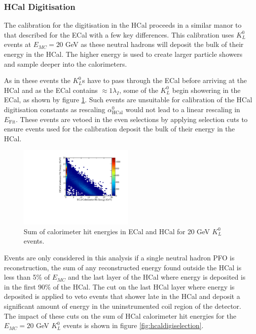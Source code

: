 
\subsubsection{HCal Digitisation}
\label{sec:hcaldigi}
The calibration for the digitisation in the HCal proceeds in a similar manor to that described for the ECal with a few key differences.  This calibration uses $K^{0}_{L}$ events at $E_{MC} = 20$ GeV as these neutral hadrons will deposit the bulk of their energy in the HCal.  The higher energy is used to create larger particle showers and sample deeper into the calorimeters.  

As in these events the $K^{0}_{L}$s have to pass through the ECal before arriving at the HCal and as the ECal contains $\approx 1 \lambda_{I}$, some of the $K^{0}_{L}$ begin showering in the ECal, as shown by figure \ref{fig:hcaldigikaonsplit}.  Such events are unsuitable for calibration of the HCal digitisation constants as rescaling $\alpha^{0}_{\text{HCal}}$ would not lead to a linear rescaling in $E_{\text{Fit}}$.  These events are vetoed in the even selections by applying selection cuts to ensure events used for the calibration deposit the bulk of their energy in the HCal.  

\begin{figure}
\includegraphics[width=0.5\textwidth]{EnergyEstimators/Plots/Calibration/Digitsation/HCal/ECalHCalKaon0LSplit.pdf}
\caption[Sum of calorimeter hit energies in ECal and HCal for 20 GeV $K^{0}_{L}$ events.]{Sum of calorimeter hit energies in ECal and HCal for 20 GeV $K^{0}_{L}$ events.}
\label{fig:hcaldigikaonsplit}
\end{figure}

Events are only considered in this analysis if a single neutral hadron PFO is reconstruction, the sum of any reconstructed energy found outside the HCal is less than 5\% of $E_{MC}$ and the last layer of the HCal where energy is deposited is in the first 90\% of the HCal.  The cut on the last HCal layer where energy is deposited is applied to veto events that shower late in the HCal and deposit a significant amount of energy in the uninstrumented coil region of the detector.  The impact of these cuts on the sum of HCal calorimeter hit energies for the $E_{MC} = 20$ GeV $K^{0}_{L}$ events is shown in figure \ref{fig:hcaldigiselection}.

